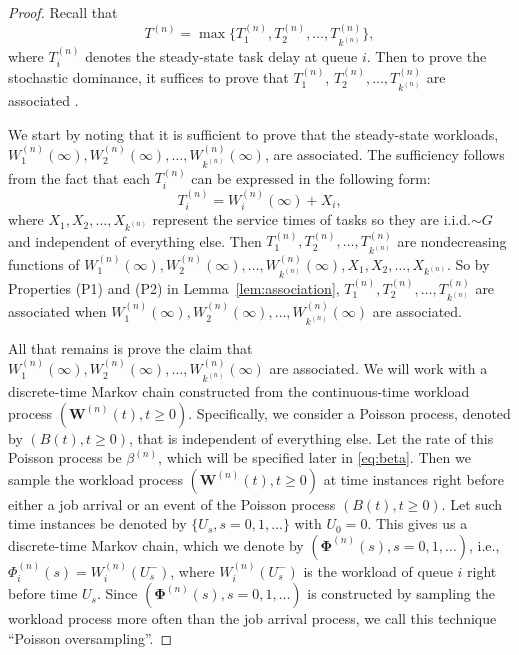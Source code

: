 \documentclass[sigconf]{acmart}
\newcommand{\expect}{\mathbb{E}} %
\newcommand{\supn}{^{(n)}}
\begin{document}
\begin{proof}
\begin{sloppypar}
Recall that
\begin{equation*}
T\supn=\max\bigl\{T\supn_1,T\supn_2,\dots,T\supn_{k\supn}\bigr\},
\end{equation*}
where $T\supn_i$ denotes the steady-state task delay at queue $i$.  Then to prove the stochastic dominance, it suffices to prove that $T\supn_1$, $T\supn_2,\dots,T\supn_{k\supn}$ are associated \cite[Theorem~5.1]{EsaProWal_67}.
\end{sloppypar}

\begin{sloppypar}
We start by noting that it is sufficient to prove that the steady-state workloads, $W\supn_1(\infty),\allowbreak W\supn_2(\infty),\dots,W\supn_{k\supn}(\infty)$, are associated.  The sufficiency follows from the fact that each $T\supn_i$ can be expressed in the following form:
\begin{equation*}
T\supn_i=W\supn_i(\infty)+X_i,
\end{equation*}
where $X_1,\allowbreak X_2,\dots,X_{k\supn}$ represent the service times of tasks so they are i.i.d.$\sim G$ and independent of everything else.  Then $T\supn_1,\allowbreak T\supn_2,\dots,T\supn_{k\supn}$ are nondecreasing functions of $W\supn_1(\infty),\allowbreak W\supn_2(\infty),\dots,W\supn_{k\supn}(\infty),\allowbreak  X_1,\allowbreak X_2,\dots,X_{k\supn}$. So by Properties (P1) and (P2) in Lemma~\ref{lem:association}, $T\supn_1,\allowbreak T\supn_2,\dots,T\supn_{k\supn}$ are associated when $W\supn_1(\infty),\allowbreak W\supn_2(\infty),\dots,W\supn_{k\supn}(\infty)$ are associated. 
\end{sloppypar}

\begin{sloppypar}
All that remains is prove the claim that $W\supn_1(\infty),\allowbreak W\supn_2(\infty),\dots,\allowbreak W\supn_{k\supn}(\infty)$ are associated.  We will work with a discrete-time Markov chain constructed from the continuous-time workload process $(\bm{W}\supn(t),t\ge 0)$.  Specifically, we consider a Poisson process, denoted by $(B(t),t\ge 0)$, that is independent of everything else.  Let the rate of this Poisson process be $\beta\supn$, which will be specified later in \eqref{eq:beta}.  Then we sample the workload process $(\bm{W}\supn(t),t\ge 0)$ at time instances right before either a job arrival or an event of the Poisson process $(B(t),t\ge 0)$.  Let such time instances be denoted by $\{U_s,s=0,1,\dots\}$ with $U_0=0$.  This gives us a discrete-time Markov chain, which we denote by $(\bm{\Phi}\supn(s),s=0,1,\dots)$, i.e., $\Phi\supn_i(s)=W\supn_i(U_s^-)$, where $W\supn_i(U_s^-)$ is the workload of queue $i$ right before time $U_s$.  Since $(\bm{\Phi}\supn(s),s=0,1,\dots)$ is constructed by sampling the workload process more often than the job arrival process, we call this technique ``Poisson oversampling''.



\end{sloppypar}
\end{proof}
\end{document}

